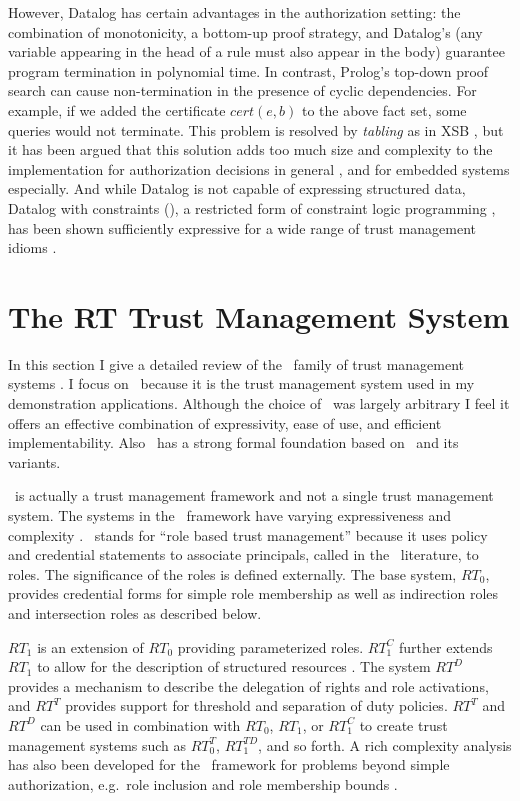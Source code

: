 However, Datalog has certain advantages in the authorization setting: the combination of
monotonicity, a bottom-up proof strategy, and Datalog's  (any variable
appearing in the head of a rule must also appear in the body) guarantee program termination in
polynomial time. In contrast, Prolog's top-down proof search can cause non-termination in the
presence of cyclic dependencies. For example, if we added the certificate $\mathit{cert}(e,b)$
to the above fact set, some queries would not terminate. This problem is resolved by
\emph{tabling} as in XSB \cite{xsb-page}, but it has been argued that this solution adds too
much size and complexity to the implementation for authorization decisions in general
\cite{Li:DRBTMF}, and for embedded systems especially. And while Datalog is not capable of
expressing structured data, Datalog with constraints (\datalogc), a restricted form of
constraint logic programming \cite{jaffar-maher-jlp94}, has been shown sufficiently expressive
for a wide range of trust management idioms \cite{Li:DCFTML}.

\section{The RT Trust Management System}
\label{section-rt}

In this section I give a detailed review of the \RT\ family of trust management systems
\cite{Li:DRBTMF}. I focus on \RT\ because it is the trust management system used in my
demonstration applications. Although the choice of \RT\ was largely arbitrary I feel it offers
an effective combination of expressivity, ease of use, and efficient implementability. Also
\RT\ has a strong formal foundation based on \datalog\ and its variants.

\RT\ is actually a trust management framework and not a single trust management system. The
systems in the \RT\ framework have varying expressiveness and complexity
\cite{Li:DRBTMF,Li:DCDTM,Li:RRBTMF}. \RT\ stands for ``role based trust management'' because it
uses policy and credential statements to associate principals, called  in the
\RT\ literature, to roles. The significance of the roles is defined externally. The base
system, $RT_0$, provides credential forms for simple role membership as well as indirection
roles and intersection roles as described below.

$RT_1$ is an extension of $RT_0$ providing parameterized roles. $RT_1^C$ further extends
$RT_1$ to allow for the description of structured resources \cite{Li:DCFTML,Li:RRBTMF}. The
system $RT^D$ provides a mechanism to describe the delegation of rights and role activations,
and $RT^T$ provides support for threshold and separation of duty policies. $RT^T$ and $RT^D$
can be used in combination with $RT_0$, $RT_1$, or $RT_1^C$ to create trust management
systems such as $RT_0^T$, $RT_1^{TD}$, and so forth. A rich complexity analysis has also been
developed for the \RT\ framework for problems beyond simple authorization, e.g.~role inclusion
and role membership bounds \cite{Li:BPOCSATM}.

